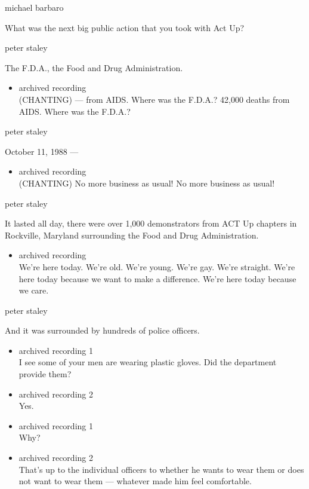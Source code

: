 michael barbaro

What was the next big public action that you took with Act Up?

peter staley

The F.D.A., the Food and Drug Administration.

\begin{itemize}
\tightlist
\item
  archived recording\\
  (CHANTING) --- from AIDS. Where was the F.D.A.? 42,000 deaths from
  AIDS. Where was the F.D.A.?
\end{itemize}

peter staley

October 11, 1988 ---

\begin{itemize}
\tightlist
\item
  archived recording\\
  (CHANTING) No more business as usual! No more business as usual!
\end{itemize}

peter staley

It lasted all day, there were over 1,000 demonstrators from ACT Up
chapters in Rockville, Maryland surrounding the Food and Drug
Administration.

\begin{itemize}
\tightlist
\item
  archived recording\\
  We're here today. We're old. We're young. We're gay. We're straight.
  We're here today because we want to make a difference. We're here
  today because we care.
\end{itemize}

peter staley

And it was surrounded by hundreds of police officers.

\begin{itemize}
\item
  archived recording 1\\
  I see some of your men are wearing plastic gloves. Did the department
  provide them?
\item
  archived recording 2\\
  Yes.
\item
  archived recording 1\\
  Why?
\item
  archived recording 2\\
  That's up to the individual officers to whether he wants to wear them
  or does not want to wear them --- whatever made him feel comfortable.
\end{itemize}

